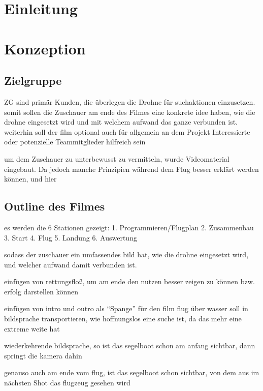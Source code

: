 \chapter{Einleitung}

\chapter{Konzeption}
\label{ch:intro}
\section{Zielgruppe}
\label{sec:intro:motivation}


ZG sind primär Kunden, die überlegen die Drohne für suchaktionen einzusetzen.
somit sollen die Zuschauer am ende des Filmes eine konkrete idee haben, wie die drohne eingesetzt wird und mit welchem aufwand das ganze verbunden ist.
weiterhin soll der film optional auch für allgemein an dem Projekt Interessierte oder potenzielle Teammitglieder hilfreich sein

um dem Zuschauer zu unterbewusst zu vermitteln, wurde Videomaterial eingebaut. Da jedoch manche Prinzipien während dem Flug besser erklärt werden können, und hier 


\section{Outline des Filmes}
\label{sec:intro:goal}
es werden die 6 Stationen gezeigt:
1. Programmieren/Flugplan
2. Zusammenbau
3. Start
4. Flug
5. Landung
6. Auswertung

sodass der zuschauer ein umfassendes bild hat, wie die drohne eingesetzt wird, und welcher aufwand damit verbunden ist.

einfügen von rettungsfloß, um am ende den nutzen besser zeigen zu können
bzw. erfolg darstellen können

einfügen von intro und outro als ``Spange'' für den film
flug über wasser soll in bildsprache transportieren, wie hoffnungslos eine suche ist, da das mehr eine extreme weite hat


wiederkehrende bildsprache, so ist das segelboot schon am anfang sichtbar, dann springt die kamera dahin

genauso auch am ende vom flug, ist das segelboot schon sichtbar, von dem aus im nächsten Shot das flugzeug gesehen wird

